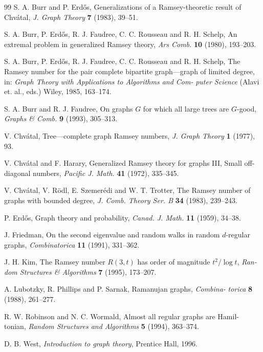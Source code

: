 \documentclass[12pt,a4paper]{article}
\begin{document}
\begin{thebibliography}{99}
S. A. Burr and P. Erd\H{o}s, Generalizations of a Ramsey-theoretic result of
Chv\'atal, \emph{J. Graph Theory} \textbf{7} (1983), 39--51.

S. A. Burr, P. Erd\H{o}s, R. J. Faudree, C. C. Rousseau and R. H.
Schelp, An extremal problem in generalized Ramsey theory, \emph{Ars Comb.} \textbf{10}
(1980), 193--203.

S. A. Burr, P. Erd\H{o}s, R. J. Faudree, C. C. Rousseau and R. H.
Schelp, The Ramsey number for the pair complete bipartite graph---graph of
limited degree, in: \emph{Graph Theory with Applications to Algorithms and Com-}
\emph{puter Science} (Alavi et. al., eds.) Wiley, 1985, 163--174.

S. A. Burr and R. J. Faudree, On graphs $G$ for which all large trees are
$G$-good, \emph{Graphs \& Comb.} \textbf{9} (1993), 305--313.

V. Chv\'atal, Tree---complete graph Ramsey numbers, \emph{J. Graph Theory} \textbf{1}
(1977), 93.

V. Chv\'atal and F. Harary, Generalized Ramsey theory for graphs III,
Small off-diagonal numbers, \emph{Pacific J. Math.} \textbf{41} (1972), 335--345.

V. Chv\'atal, V. R\"odl, E. Szemer\'edi and W. T. Trotter, The Ramsey
number of graphs with bounded degree, \emph{J. Comb. Theory Ser. B} \textbf{34} (1983),
239--243.

P. Erd\H{o}s, Graph theory and probability, \emph{Canad. J. Math.} \textbf{11} (1959), 34--38.

J. Friedman, On the second eigenvalue and random walks in random $d$-regular
graphs, \emph{Combinatorica} \textbf{11} (1991), 331--362.

J. H. Kim, The Ramsey number $R(3,t)$ has order of magnitude $t^2/\log t$, \emph{Ran-}
\emph{dom Structures \& Algorithms} \textbf{7} (1995), 173--207.

A. Lubotzky, R. Phillips and P. Sarnak, Ramanujan graphs, \emph{Combina-}
\emph{torica} \textbf{8} (1988), 261--277.

R. W. Robinson and N. C. Wormald, Almost all regular graphs are Hamil-
tonian, \emph{Random Structures and Algorithms} \textbf{5} (1994), 363--374.

D. B. West, \emph{Introduction to graph theory}, Prentice Hall, 1996.

\end{thebibliography}
\end{document}
